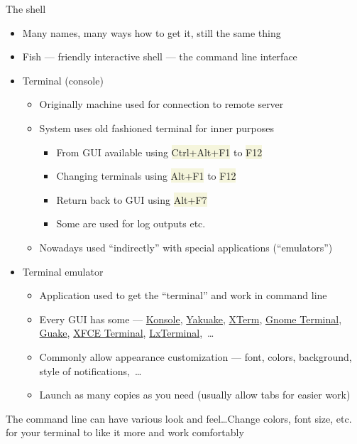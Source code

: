 \documentclass[compress, ucs, xelatex, 11pt, xcolor=svgnames, aspectratio=169,
	hyperref={
		bookmarks=true,
		unicode=true,
		colorlinks=true,
		pdftitle={Linux, command line and MetaCentrum},
		plainpages=false,
		pdfauthor={Vojtech Zeisek},
		pdfsubject={Course about use of Linux command line, writing shell scripts and using MetaCentrum of CESNET},
		pdfcreator={XeLaTeX},
		pdfkeywords={Linux, GNU, BASH, shell, command line, MetaCentrum},
		linkcolor=DarkRed, %
		anchorcolor=DarkBlue, %
		citecolor=Indigo, %
		filecolor=NavyBlue, %
		menucolor=DarkMagenta, %
		urlcolor=DarkBlue, %
		pdftex},
	url={hyphens, lowtilde} %
	]{beamer}
\renewcommand{\texttt}[1]{\colorbox{Beige}{{\ttfamily #1}}}
\begin{document}
\begin{frame}{The shell}
	\begin{itemize}
		\item Many names, many ways how to get it, still the same thing
		\item Fish --- friendly interactive shell --- the command line interface
		\item Terminal (console)
		\begin{itemize}
			\item Originally machine used for connection to remote server
			\item System uses old fashioned terminal for inner purposes
			\begin{itemize}
				\item From GUI available using \texttt{Ctrl+Alt+F1} to \texttt{F12}
				\item Changing terminals using \texttt{Alt+F1} to \texttt{F12}
				\item Return back to GUI using \texttt{Alt+F7}
				\item Some are used for log outputs etc.
			\end{itemize}
			\item Nowadays used \enquote{indirectly} with special applications (\enquote{emulators})
		\end{itemize}
		\item Terminal emulator
		\begin{itemize}
			\item Application used to get the \enquote{terminal} and work in command line
			\item Every GUI has some --- \href{https://konsole.kde.org/}{Konsole}, \href{https://apps.kde.org/en/yakuake}{Yakuake}, \href{https://invisible-island.net/xterm/}{XTerm}, \href{https://wiki.gnome.org/Apps/Terminal}{Gnome Terminal}, \href{http://guake.org/}{Guake}, \href{https://docs.xfce.org/apps/terminal/start}{XFCE Terminal}, \href{https://wiki.lxde.org/en/LXTerminal}{LxTerminal},~\ldots
			\item Commonly allow appearance customization --- font, colors, background, style of notifications,~\ldots
			\item Launch as many copies as you need (usually allow tabs for easier work)
		\end{itemize}
	\end{itemize}
\end{frame}

\begin{frame}{The command line can have various look and feel\ldots}{Change colors, font size, etc. for your terminal to like it more and work comfortably}
	\begin{center}
		\texttt{[image: terminals.png]}
	\end{center}
\end{frame}
\end{document}

